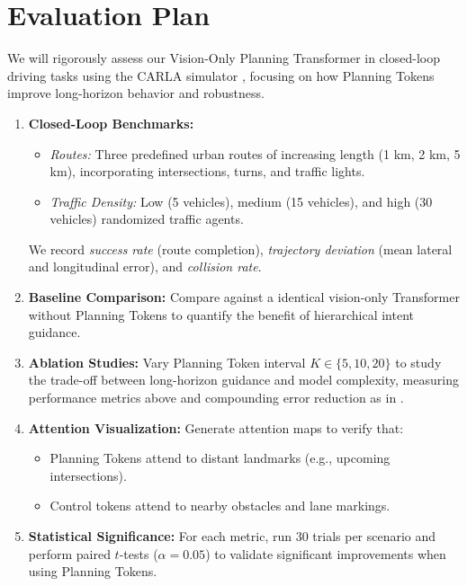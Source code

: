 \documentclass[11pt,a4paper]{article}
\begin{document}
\section*{Evaluation Plan}

We will rigorously assess our Vision-Only Planning Transformer in closed-loop driving tasks using the CARLA simulator \cite{Dosovitskiy2017CARLA}, focusing on how Planning Tokens improve long-horizon behavior and robustness.

\begin{enumerate}
    \item \textbf{Closed-Loop Benchmarks:}
          \begin{itemize}
              \item \emph{Routes:} Three predefined urban routes of increasing length (1 km, 2 km, 5 km), incorporating intersections, turns, and traffic lights.
              \item \emph{Traffic Density:} Low (5 vehicles), medium (15 vehicles), and high (30 vehicles) randomized traffic agents.
          \end{itemize}
          We record \emph{success rate} (route completion), \emph{trajectory deviation} (mean lateral and longitudinal error), and \emph{collision rate}.

    \item \textbf{Baseline Comparison:}
          Compare against a identical vision-only Transformer without Planning Tokens to quantify the benefit of hierarchical intent guidance.

    \item \textbf{Ablation Studies:}
          Vary Planning Token interval \(K\in\{5,10,20\}\) to study the trade-off between long-horizon guidance and model complexity, measuring performance metrics above and compounding error reduction as in \cite{Clinton2024planning}.

    \item \textbf{Attention Visualization:}
          Generate attention maps to verify that:
          \begin{itemize}
              \item Planning Tokens attend to distant landmarks (e.g., upcoming intersections).
              \item Control tokens attend to nearby obstacles and lane markings.
          \end{itemize}

    \item \textbf{Statistical Significance:}
          For each metric, run 30 trials per scenario and perform paired \(t\)-tests (\(\alpha=0.05\)) to validate significant improvements when using Planning Tokens.
\end{enumerate}
\end{document}
